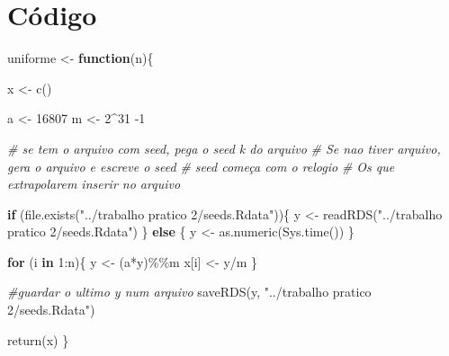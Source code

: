 \documentclass[
]{article}
\newenvironment{Shaded}{\begin{snugshade}}{\end{snugshade}}
\newcommand{\CommentTok}[1]{\textcolor[rgb]{0.56,0.35,0.01}{\textit{#1}}}
\newcommand{\ControlFlowTok}[1]{\textcolor[rgb]{0.13,0.29,0.53}{\textbf{#1}}}
\newcommand{\DecValTok}[1]{\textcolor[rgb]{0.00,0.00,0.81}{#1}}
\newcommand{\FunctionTok}[1]{\textcolor[rgb]{0.00,0.00,0.00}{#1}}
\newcommand{\NormalTok}[1]{#1}
\newcommand{\OtherTok}[1]{\textcolor[rgb]{0.56,0.35,0.01}{#1}}
\newcommand{\SpecialCharTok}[1]{\textcolor[rgb]{0.00,0.00,0.00}{#1}}
\newcommand{\StringTok}[1]{\textcolor[rgb]{0.31,0.60,0.02}{#1}}
\begin{document}
\hypertarget{cuxf3digo}{%
\section{Código}\label{cuxf3digo}}

\begin{Shaded}
\begin{Highlighting}[]
\NormalTok{uniforme }\OtherTok{\textless{}{-}} \ControlFlowTok{function}\NormalTok{(n)\{}
  
\NormalTok{  x }\OtherTok{\textless{}{-}} \FunctionTok{c}\NormalTok{()}
  
\NormalTok{  a }\OtherTok{\textless{}{-}} \DecValTok{16807}
\NormalTok{  m }\OtherTok{\textless{}{-}} \DecValTok{2}\SpecialCharTok{\^{}}\DecValTok{31} \SpecialCharTok{{-}}\DecValTok{1}
  
  \CommentTok{\# se tem o arquivo com seed, pega o seed k do arquivo}
  \CommentTok{\# Se nao tiver arquivo, gera o arquivo e escreve o seed}
  \CommentTok{\# seed começa com o relogio}
  \CommentTok{\# Os que extrapolarem inserir no arquivo}
  
  \ControlFlowTok{if}\NormalTok{ (}\FunctionTok{file.exists}\NormalTok{(}\StringTok{"../trabalho pratico 2/seeds.Rdata"}\NormalTok{))\{}
\NormalTok{    y }\OtherTok{\textless{}{-}} \FunctionTok{readRDS}\NormalTok{(}\StringTok{"../trabalho pratico 2/seeds.Rdata"}\NormalTok{)}
\NormalTok{  \} }\ControlFlowTok{else}\NormalTok{ \{}
\NormalTok{    y }\OtherTok{\textless{}{-}} \FunctionTok{as.numeric}\NormalTok{(}\FunctionTok{Sys.time}\NormalTok{())}
\NormalTok{  \}}
  
  \ControlFlowTok{for}\NormalTok{ (i }\ControlFlowTok{in} \DecValTok{1}\SpecialCharTok{:}\NormalTok{n)\{}
\NormalTok{    y }\OtherTok{\textless{}{-}}\NormalTok{ (a}\SpecialCharTok{*}\NormalTok{y)}\SpecialCharTok{\%\%}\NormalTok{m}
\NormalTok{    x[i] }\OtherTok{\textless{}{-}}\NormalTok{ y}\SpecialCharTok{/}\NormalTok{m}
\NormalTok{  \}}
  
  \CommentTok{\#guardar o ultimo y num arquivo}
  \FunctionTok{saveRDS}\NormalTok{(y, }\StringTok{"../trabalho pratico 2/seeds.Rdata"}\NormalTok{)}
  
  \FunctionTok{return}\NormalTok{(x)}
\NormalTok{\}}


\end{Highlighting}
\end{Shaded}
\end{document}
